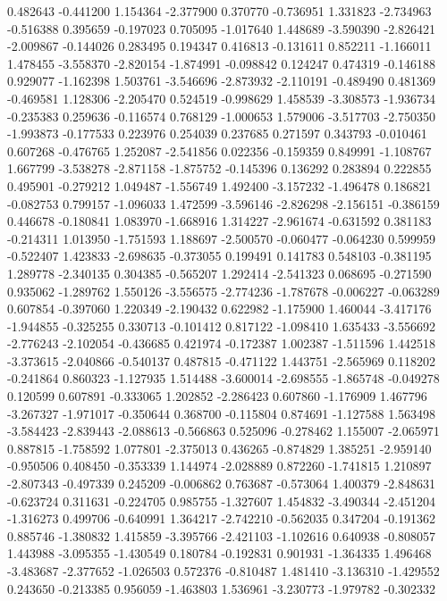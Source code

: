 0.482643
-0.441200
1.154364
-2.377900
0.370770
-0.736951
1.331823
-2.734963
-0.516388
0.395659
-0.197023
0.705095
-1.017640
1.448689
-3.590390
-2.826421
-2.009867
-0.144026
0.283495
0.194347
0.416813
-0.131611
0.852211
-1.166011
1.478455
-3.558370
-2.820154
-1.874991
-0.098842
0.124247
0.474319
-0.146188
0.929077
-1.162398
1.503761
-3.546696
-2.873932
-2.110191
-0.489490
0.481369
-0.469581
1.128306
-2.205470
0.524519
-0.998629
1.458539
-3.308573
-1.936734
-0.235383
0.259636
-0.116574
0.768129
-1.000653
1.579006
-3.517703
-2.750350
-1.993873
-0.177533
0.223976
0.254039
0.237685
0.271597
0.343793
-0.010461
0.607268
-0.476765
1.252087
-2.541856
0.022356
-0.159359
0.849991
-1.108767
1.667799
-3.538278
-2.871158
-1.875752
-0.145396
0.136292
0.283894
0.222855
0.495901
-0.279212
1.049487
-1.556749
1.492400
-3.157232
-1.496478
0.186821
-0.082753
0.799157
-1.096033
1.472599
-3.596146
-2.826298
-2.156151
-0.386159
0.446678
-0.180841
1.083970
-1.668916
1.314227
-2.961674
-0.631592
0.381183
-0.214311
1.013950
-1.751593
1.188697
-2.500570
-0.060477
-0.064230
0.599959
-0.522407
1.423833
-2.698635
-0.373055
0.199491
0.141783
0.548103
-0.381195
1.289778
-2.340135
0.304385
-0.565207
1.292414
-2.541323
0.068695
-0.271590
0.935062
-1.289762
1.550126
-3.556575
-2.774236
-1.787678
-0.006227
-0.063289
0.607854
-0.397060
1.220349
-2.190432
0.622982
-1.175900
1.460044
-3.417176
-1.944855
-0.325255
0.330713
-0.101412
0.817122
-1.098410
1.635433
-3.556692
-2.776243
-2.102054
-0.436685
0.421974
-0.172387
1.002387
-1.511596
1.442518
-3.373615
-2.040866
-0.540137
0.487815
-0.471122
1.443751
-2.565969
0.118202
-0.241864
0.860323
-1.127935
1.514488
-3.600014
-2.698555
-1.865748
-0.049278
0.120599
0.607891
-0.333065
1.202852
-2.286423
0.607860
-1.176909
1.467796
-3.267327
-1.971017
-0.350644
0.368700
-0.115804
0.874691
-1.127588
1.563498
-3.584423
-2.839443
-2.088613
-0.566863
0.525096
-0.278462
1.155007
-2.065971
0.887815
-1.758592
1.077801
-2.375013
0.436265
-0.874829
1.385251
-2.959140
-0.950506
0.408450
-0.353339
1.144974
-2.028889
0.872260
-1.741815
1.210897
-2.807343
-0.497339
0.245209
-0.006862
0.763687
-0.573064
1.400379
-2.848631
-0.623724
0.311631
-0.224705
0.985755
-1.327607
1.454832
-3.490344
-2.451204
-1.316273
0.499706
-0.640991
1.364217
-2.742210
-0.562035
0.347204
-0.191362
0.885746
-1.380832
1.415859
-3.395766
-2.421103
-1.102616
0.640938
-0.808057
1.443988
-3.095355
-1.430549
0.180784
-0.192831
0.901931
-1.364335
1.496468
-3.483687
-2.377652
-1.026503
0.572376
-0.810487
1.481410
-3.136310
-1.429552
0.243650
-0.213385
0.956059
-1.463803
1.536961
-3.230773
-1.979782
-0.302332
